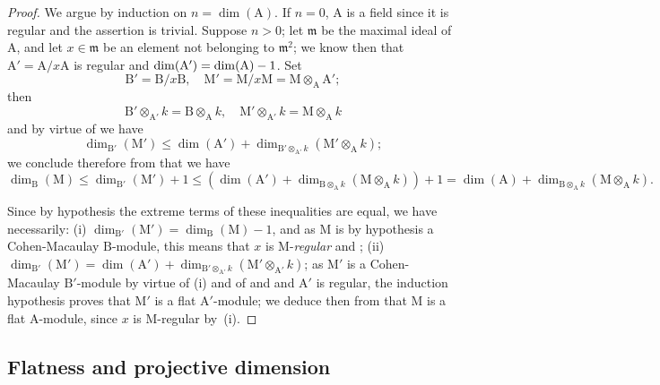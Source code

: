 \begin{proof}
We argue by induction on $n=\dim(\mathrm{A})$.
If $n=0$, $\mathrm{A}$ is a field since it is regular  and the assertion is trivial.
Suppose $n>0$; let $\mathfrak{m}$ be the maximal ideal of $\mathrm{A}$, and let $x\in\mathfrak{m}$ be an element not belonging to $\mathfrak{m}^2$; we know then  that $\mathrm{A}'=\mathrm{A}/x\mathrm{A}$ is regular and $\dim(\mathrm{A}')=\dim(\mathrm{A})- 1$.
Set
\[
  \mathrm{B}'=\mathrm{B}/x\mathrm{B},\quad \mathrm{M}'=\mathrm{M}/x\mathrm{M}=\mathrm{M}\otimes_\mathrm{A}\mathrm{A}';
\]
then
\[
  \mathrm{B}'\otimes_{\mathrm{A}'}k=\mathrm{B}\otimes_\mathrm{A} k,\quad \mathrm{M}'\otimes_{\mathrm{A}'}k=\mathrm{M}\otimes_\mathrm{A} k
\]
and by virtue of  we have
\[
  \dim_{\mathrm{B}'}(\mathrm{M}')\leqslant\dim(\mathrm{A}')+\dim_{\mathrm{B}'\otimes_{\mathrm{A}'}k}(\mathrm{M}'\otimes_\mathrm{A} k);
\]
we conclude therefore from  that we have
\[
  \dim_\mathrm{B}(\mathrm{M})\leqslant\dim_{\mathrm{B}'}(\mathrm{M}')+1\leqslant(\dim(\mathrm{A}')+\dim_{\mathrm{B}\otimes_\mathrm{A} k}(\mathrm{M}\otimes_\mathrm{A} k))+1=\dim(\mathrm{A})+\dim_{\mathrm{B}\otimes_\mathrm{A} k}(\mathrm{M}\otimes_\mathrm{A} k).
\]

Since by hypothesis the extreme terms of these inequalities are equal, we have necessarily: (i) $\dim_{\mathrm{B}'}(\mathrm{M}')=\dim_\mathrm{B}(\mathrm{M})-1$, and as $\mathrm{M}$ is by hypothesis a Cohen-Macaulay $\mathrm{B}$-module, this means that $x$ is M-\emph{regular}  and ; (ii) $\dim_{\mathrm{B}'}(\mathrm{M}')=\dim(\mathrm{A}')+\dim_{\mathrm{B}'\otimes_{\mathrm{A}'}k}(\mathrm{M}'\otimes_{\mathrm{A}'}k)$; as $\mathrm{M}'$ is a Cohen-Macaulay $\mathrm{B}'$-module by virtue of (i) and of  and  and $\mathrm{A}'$ is regular, the induction hypothesis proves that $\mathrm{M}'$ is a flat $\mathrm{A}'$-module; we deduce then from  that $\mathrm{M}$ is a flat $\mathrm{A}$-module, since $x$ is M-regular by~(i).
\end{proof}

\subsection{Flatness and projective dimension}
\label{subsection:IV.6.2}

